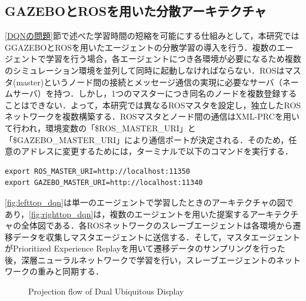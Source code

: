 \documentclass[12pt]{sonota/aislab}
\begin{document}
\subsection{GAZEBOとROSを用いた分散アーキテクチャ}
\ref{DQNの問題}節で述べた学習時間の短縮を可能にする仕組みとして，本研究ではGGAZEBOとROSを用いたエージェントの分散学習の導入を行う．複数のエージェントで学習を行う場合，各エージェントにつき各環境が必要になるため複数のシミュレーション環境を並列して同時に起動しなければならない．ROSはマスタ(master)というノード間の接続とメッセージ通信の実現に必要なサーバ（ネームサーバ）を持つ．しかし，1つのマスターにつき同名のノードを複数登録することはできない．よって，本研究では異なるROSマスタを設定し，独立したROSネットワークを複数構築する．ROSマスタとノード間の通信はXML-PRCを用いて行われ，環境変数の「\$ROS\_MASTER\_URI」と「\$GAZEBO\_MASTER\_URI」により通信ポートが決定される．そのため，任意のアドレスに変更するためには，ターミナルで以下のコマンドを実行する．

\begin{lstlisting}
export ROS_MASTER_URI=http://localhost:11350
export GAZEBO_MASTER_URI=http://localhost:11340
\end{lstlisting}

\ref{fig:lefttop_dqn}は単一のエージェントで学習したときのアーキテクチャの図であり，\ref{fig:righttop_dqn}は，複数のエージェントを用いた提案するアーキテクチャの全体図である．各ROSネットワークのスレーブエージェントは各環境から遷移データを収集しマスタエージェントに送信する．そして，マスタエージェントがPrioritized Experience Replayを用いて遷移データのサンプリングを行った後，深層ニューラルネットワークで学習を行い，スレーブエージェントのネットワークの重みと同期する．

\begin{figure}[tbp]

	\begin{center}
	\hspace{10mm}
	\end{center}
	
	\caption{Projection flow of Dual Ubiquitous Display}
	\label{fig:twofig_dqn}
\end{figure}
\end{document}
